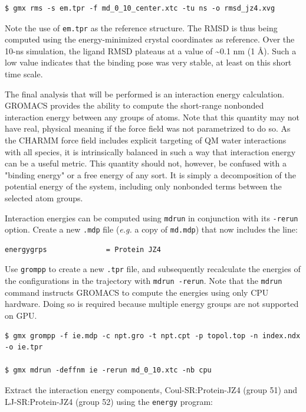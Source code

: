 \documentclass[9pt,tutorial,pubversion]{livecoms}
\begin{document}
\begin{lstlisting}
$ gmx rms -s em.tpr -f md_0_10_center.xtc -tu ns -o rmsd_jz4.xvg
\end{lstlisting}
%
Note the use of \texttt{em.tpr} as the reference structure. The RMSD is thus being computed using the energy-minimized crystal coordinates as reference. Over the 10-ns simulation, the ligand RMSD plateaus at a value of \textasciitilde0.1 nm (1 \AA). Such a low value indicates that the binding pose was very stable, at least on this short time scale.

The final analysis that will be performed is an interaction energy calculation. GROMACS provides the ability to compute the short-range nonbonded interaction energy between any groups of atoms. Note that this quantity may not have real, physical meaning if the force field was not parametrized to do so. As the CHARMM force field includes explicit targeting of QM water interactions with all species, it is intrinsically balanced in such a way that interaction energy can be a useful metric. This quantity should not, however, be confused with a "binding energy" or a free energy of any sort. It is simply a decomposition of the potential energy of the system, including only nonbonded terms between the selected atom groups.

Interaction energies can be computed using \texttt{mdrun} in conjunction with its \texttt{-rerun} option. Create a new \texttt{.mdp} file ({\em e.g.} a copy of \texttt{md.mdp}) that now includes the line:

\begin{lstlisting}
energygrps              = Protein JZ4
\end{lstlisting}

Use \texttt{grompp} to create a new \texttt{.tpr} file, and subsequently recalculate the energies of the configurations in the trajectory with \texttt{mdrun -rerun}. Note that the \texttt{mdrun} command instructs GROMACS to compute the energies using only CPU hardware. Doing so is required because multiple energy groups are not supported on GPU.

\begin{lstlisting}
$ gmx grompp -f ie.mdp -c npt.gro -t npt.cpt -p topol.top -n index.ndx -o ie.tpr

$ gmx mdrun -deffnm ie -rerun md_0_10.xtc -nb cpu
\end{lstlisting}

Extract the interaction energy components, Coul-SR:Protein-JZ4 (group 51) and LJ-SR:Protein-JZ4 (group 52) using the \texttt{energy} program:
\end{document}
